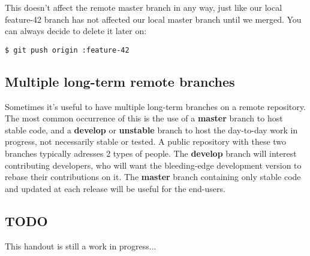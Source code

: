 \documentclass{../../common/tufte-latex/tufte-handout}
\begin{document}
This doesn't affect the remote master branch in any way, just like our local feature-42 branch has not affected our local master branch until we merged.
You can always decide to delete it later on:
\begin{lstlisting}[style=BashInputStyle]
  $ git push origin :feature-42
\end{lstlisting}

\subsection{Multiple long-term remote branches}
Sometimes it's useful to have multiple long-term branches on a remote repository.
The most common occurrence of this is the use of a \textbf{master} branch to host stable code, and a \textbf{develop} or \textbf{unstable} branch to host the day-to-day work in progress, not necessarily stable or tested.
A public repository with these two branches typically adresses 2 types of people.
The \textbf{develop} branch will interest contributing developers, who will want the bleeding-edge development version to rebase their contributions on it.
The \textbf{master} branch containing only stable code and updated at each release will be useful for the end-users.

\subsection{TODO}

This handout is still a work in progress...



\end{document}
